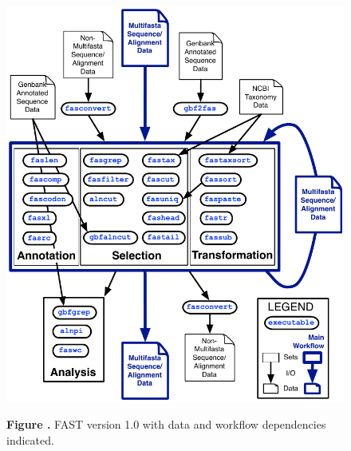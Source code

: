 \documentclass{frontiersSCNS} %
\begin{document}
\begin{figure}
\begin{center}
\includegraphics[width=4.5in]{FAST_v7}%
\end{center}
 \textbf{\label{fig:01} Figure
   .}{ FAST version 1.0 with data and workflow
   dependencies indicated.}
\end{figure}
\end{document}
